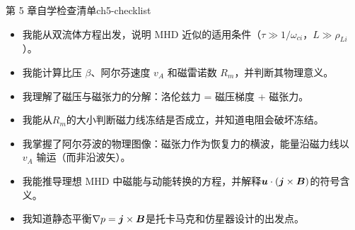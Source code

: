 \begin{checklistbox}{第 5 章自学检查清单}{ch5-checklist}
\begin{itemize}[leftmargin=*,label=$\square$]
\item 我能从双流体方程出发，说明 MHD 近似的适用条件（$\tau\gg 1/\omega_{ci}$，$L\gg\rho_{Li}$）。
\item 我能计算比压 $\beta$、阿尔芬速度 $v_A$ 和磁雷诺数 $R_m$，并判断其物理意义。
\item 我理解了磁压与磁张力的分解：洛伦兹力 = 磁压梯度 + 磁张力。
\item 我能从$R_m$的大小判断磁力线冻结是否成立，并知道电阻会破坏冻结。
\item 我掌握了阿尔芬波的物理图像：磁张力作为恢复力的横波，能量沿磁力线以 $v_A$ 输运（而非沿波矢）。
\item 我能推导理想 MHD 中磁能与动能转换的方程，并解释$\bm{u}\cdot(\bm{j}\times\bm{B})$的符号含义。
\item 我知道静态平衡$\nabla p = \bm{j}\times\bm{B}$是托卡马克和仿星器设计的出发点。
\end{itemize}
\end{checklistbox}


\endinput
